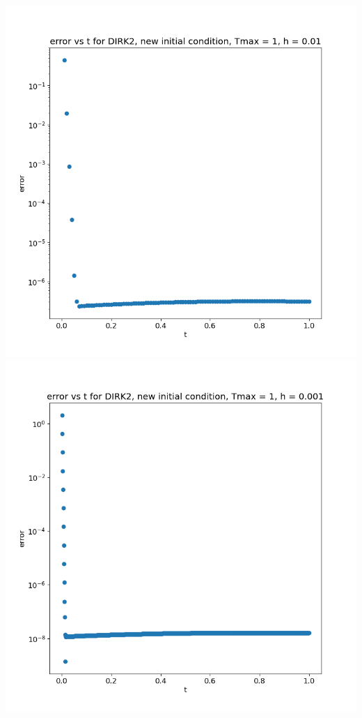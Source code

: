\documentclass{article}
\begin{document}
\begin{enumerate}[label=(\alph*)]
\begin{center}
	\includegraphics[scale=.3]{hw3 dirk2 err vs t graph 5}
	\includegraphics[scale=.3]{hw3 dirk2 err vs t graph 6}
	

\end{center}
\end{enumerate}
\end{document}
